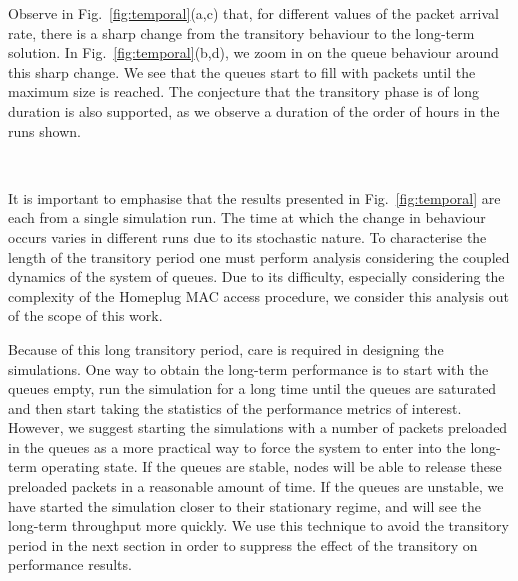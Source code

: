 \documentclass[preprint,12pt]{elsarticle}
\begin{document}
Observe in Fig.~\ref{fig:temporal}(a,c) that, for different values of the packet arrival rate, there is a sharp change from the transitory behaviour to the long-term solution. In Fig.~\ref{fig:temporal}(b,d), we zoom in on the queue behaviour around this sharp change. We see that the queues start to fill with packets until the maximum size is reached. The conjecture that the transitory phase is of long duration is also supported, as we observe a duration of the order of hours in the runs shown.

\begin{figure*}[th!!!!!]
\centering


\\

\caption{Evolution of throughput and queue size (CA3/2, $n=50$ nodes).}
\label{fig:temporal}
\end{figure*}


It is important to emphasise that the results presented in Fig.~\ref{fig:temporal} are each from a single simulation run. The time at which the change in behaviour occurs varies in different runs due to its stochastic nature. To characterise the length of the transitory period one must perform analysis considering the coupled dynamics of the system of queues. Due to its difficulty, especially considering the complexity of the Homeplug MAC access procedure, we consider this analysis out of the scope of this work.

Because of this long transitory period, care is required in designing the simulations. One way to obtain the long-term performance is to start with the queues empty, run the simulation for a long time until the queues are saturated and then start taking the statistics of the performance metrics of interest. However, we suggest starting the simulations with a number of packets preloaded in the queues as a more practical way to force the system to enter into the long-term operating state. If the queues are stable, nodes will be able to release these preloaded packets in a reasonable amount of time. If the queues are unstable, we have started the simulation closer to their stationary regime, and will see the long-term throughput more quickly. We use this technique to avoid the transitory period in the next section in order to suppress the effect of the transitory on performance results.
\end{document}
